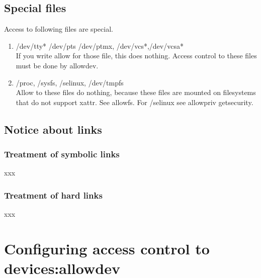 \documentclass{article}
\begin{document}
\subsection{Special files}
Access to following files are special.
\begin{enumerate}
 \item  /dev/tty* /dev/pts /dev/ptmx, /dev/vcs*,/dev/vcsa*\\
	If you write allow for those file, this does nothing.
	Access control to these files must be done by allowdev. 
 \item  /proc, /sysfs, /selinux, /dev/tmpfs\\
	Allow to these files do nothing, because these files are mounted
	on filesystems that do not support xattr. See allowfs. For
	/selinux see allowpriv getsecurity.
\end{enumerate}


\subsection{Notice about links}
\subsubsection{Treatment of symbolic links}
xxx
\subsubsection{Treatment of hard links}
xxx

\section{Configuring access control to devices:allowdev}
\end{document}
